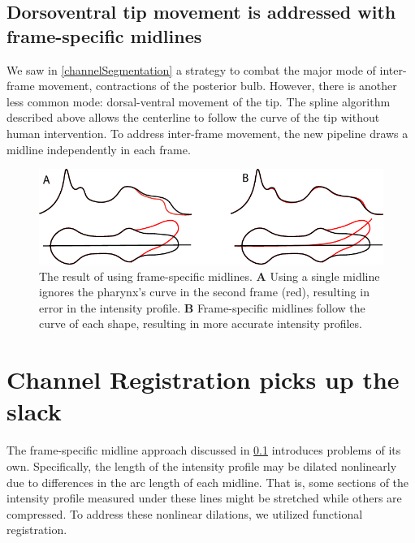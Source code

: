 \subsection{Dorsoventral tip movement is addressed with frame-specific midlines} \label{frameSpecificMidlines}
We saw in \ref{channelSegmentation} a strategy to combat the major mode of inter-frame movement, contractions of the posterior bulb. However, there is another less common mode: dorsal-ventral movement of the tip. The spline algorithm described above allows the centerline to follow the curve of the tip without human intervention. To address inter-frame movement, the new pipeline draws a midline independently in each frame.

\begin{figure}[ht]
    \centering
    \includegraphics{Figures/rendered_files/dual_midlines}
    \decoRule
    \caption[Frame-specific midlines]{The result of using frame-specific midlines. \textbf{A} Using a single midline ignores the pharynx's curve in the second frame (red), resulting in error in the intensity profile. \textbf{B} Frame-specific midlines follow the curve of each shape, resulting in more accurate intensity profiles.}
    \label{fig:DualMidlines}
\end{figure}

\section{Channel Registration picks up the slack} \label{method:Registration}

The frame-specific midline approach discussed in \ref{frameSpecificMidlines} introduces problems of its own. Specifically, the length of the intensity profile may be dilated nonlinearly due to differences in the arc length of each midline. That is, some sections of the intensity profile measured under these lines might be stretched while others are compressed. To address these nonlinear dilations, we utilized functional registration.


